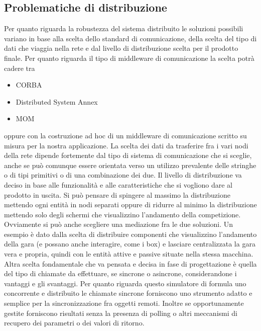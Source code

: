 \subsection{Problematiche di distribuzione}
Per quanto riguarda la robustezza del sistema distribuito le soluzioni possibili
variano in base alla scelta dello standard di comunicazione, della scelta del
tipo di dati che viaggia nella rete e dal livello di distribuzione scelta per il
prodotto finale.
Per quanto riguarda il tipo di middleware di comunicazione la scelta potr\`{a}
cadere tra 
\begin{itemize}
\item CORBA
\item Distributed System Annex 
\item MOM
\end{itemize}
oppure con la costruzione ad hoc di un middleware di comunicazione scritto su
misura per la nostra applicazione.
La scelta dei dati da trasferire fra i vari nodi della rete dipende fortemente
dal tipo di sistema di comunicazione che si sceglie, anche se può comunque
essere orientata verso un utilizzo prevalente delle stringhe o di tipi primitivi
o di una combinazione dei due. Il livello di distribuzione va deciso in base
alle funzionalit\`{a} e alle caratteristiche che si vogliono dare al prodotto in
uscita. Si può pensare di spingere al massimo la distribuzione mettendo ogni
entit\`{a} in nodi separati oppure di ridurre al minimo la distribuzione
mettendo solo degli schermi che visualizzino l'andamento della competizione.
Ovviamente si pu\`{o} anche scegliere una mediazione fra le due soluzioni. Un
esempio \`{e} dato dalla scelta di distribuire componenti che visualizzino
l'andamento della gara (e possano anche interagire, come i box) e lasciare
centralizzata la gara vera e propria, quindi con le entit\`{a} attive e passive
situate nella stessa macchina. Altra scelta fondamentale che va pensata e decisa
in fase di progettazione \`{e} quella del tipo di chiamate da effettuare, se
sincrone o asincrone, considerandone i vantaggi e gli svantaggi. Per quanto
riguarda questo simulatore di formula uno concorrente e distribuito le chiamate
sincrone forniscono uno strumento adatto e semplice per la sincronizzazione fra
oggetti remoti. Inoltre se opportunamente gestite forniscono risultati senza
la presenza di polling o altri meccanismi di recupero dei parametri o dei valori
di ritorno.
